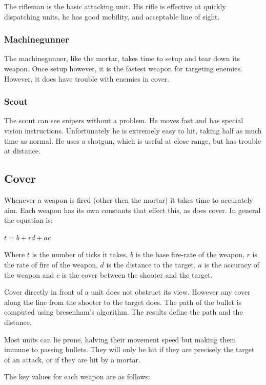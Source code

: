 \documentclass{article}
\begin{document}
The rifleman is the basic attacking unit. His rifle is effective at quickly
dispatching units, he has good mobility, and acceptable line of sight.

\subsubsection*{Machinegunner}

The machinegunner, like the mortar, takes time to setup and tear down its
weapon. Once setup however, it is the fastest weapon for targeting enemies.
However, it does have trouble with enemies in cover.

\subsubsection*{Scout}

The scout can see snipers without a problem. He moves fast and has special
vision instructions. Unfortunately he is extremely easy to hit, taking half as
much time as normal. He uses a shotgun, which is useful at close range, but has
trouble at distance.

\subsection*{Cover}

Whenever a weapon is fired (other then the mortar) it takes time to accurately
aim. Each weapon has its own constants that effect this, as does cover. In
general the equation is:

$t=b+rd+ac$

Where $t$ is the number of ticks it takes, $b$ is the base fire-rate of the
weapon, $r$ is the rate of fire of the weapon, $d$ is the distance to the
target, $a$ is the accuracy of the weapon and $c$ is the cover between the
shooter and the target.

Cover directly in front of a unit does not obstruct its view. However any cover
along the line from the shooter to the target does. The path of the bullet is
computed using bresenham's algorithm. The results define the path and the
distance.

Most units can lie prone, halving their movement speed but making them immune to
passing bullets. They will only be hit if they are precisely the target of an
attack, or if they are hit by a mortar.

The key values for each weapon are as follows:
\end{document}
